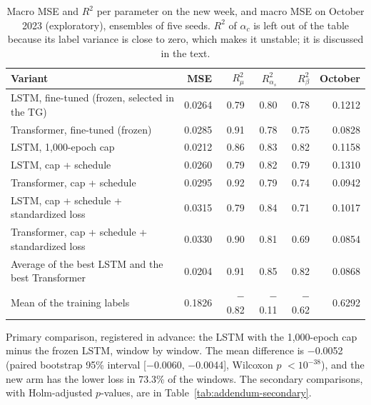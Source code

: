 \begin{table}[htbp]
\centering
\caption{Macro MSE and $R^2$ per parameter on the new week, and macro MSE on October 2023
(exploratory), ensembles of five seeds. $R^2$ of $\alpha_c$ is left out of the table because
its label variance is close to zero, which makes it unstable; it is discussed in the text.}
\label{tab:addendum-holdout}
\small
\begin{tabular}{lrrrrr}
\toprule
Variant & MSE & $R^2_\mu$ & $R^2_{\alpha_s}$ & $R^2_\beta$ & October \\
\midrule
LSTM, fine-tuned (frozen, selected in the TG) & 0.0264 & 0.79 & 0.80 & 0.78 & 0.1212 \\
Transformer, fine-tuned (frozen) & 0.0285 & 0.91 & 0.78 & 0.75 & 0.0828 \\
LSTM, 1,000-epoch cap & 0.0212 & 0.86 & 0.83 & 0.82 & 0.1158 \\
LSTM, cap + schedule & 0.0260 & 0.79 & 0.82 & 0.79 & 0.1310 \\
Transformer, cap + schedule & 0.0295 & 0.92 & 0.79 & 0.74 & 0.0942 \\
LSTM, cap + schedule + standardized loss & 0.0315 & 0.79 & 0.84 & 0.71 & 0.1017 \\
Transformer, cap + schedule + standardized loss & 0.0330 & 0.90 & 0.81 & 0.69 & 0.0854 \\
Average of the best LSTM and the best Transformer & 0.0204 & 0.91 & 0.85 & 0.82 & 0.0868 \\
Mean of the training labels & 0.1826 & $-$0.82 & $-$0.11 & $-$0.62 & 0.6292 \\
\bottomrule
\end{tabular}
\end{table}

Primary comparison, registered in advance: the LSTM with the 1,000-epoch cap minus the frozen LSTM,
window by window. The mean difference is $-$0.0052
(paired bootstrap 95\% interval [$-$0.0060, $-$0.0044], Wilcoxon $p$ $<10^{-38}$),
and the new arm has the lower loss in 73.3\% of the windows. The
secondary comparisons, with Holm-adjusted $p$-values, are in
Table~\ref{tab:addendum-secondary}.

